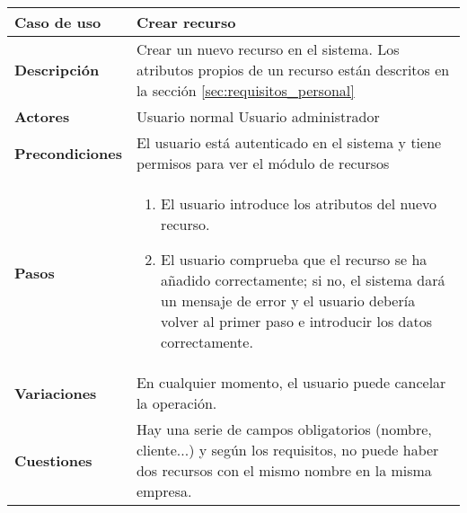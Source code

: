 \begin{tabular}{|p{1.25in}|p{3.65in}|}\hline
\textbf{Caso de uso} & \textbf{Crear recurso}\\\hline\hline
\textbf{Descripción} & Crear un nuevo recurso en el sistema. Los
atributos propios de un recurso están descritos en la sección
\ref{sec:requisitos_personal}\\\hline
\textbf{Actores} & Usuario normal \newline Usuario administrador\\\hline
\textbf{Precondiciones} & El usuario está autenticado en el sistema y
tiene permisos para ver el módulo de recursos\\\hline
\textbf{Pasos} & 
  \begin{enumerate}
   \item El usuario introduce los atributos del nuevo recurso.
   \item El usuario comprueba que el recurso se ha añadido correctamente; si
no, el sistema dará un mensaje de error y el usuario debería volver al primer
paso e introducir los datos correctamente.
  \end{enumerate}
\\\hline
\textbf{Variaciones} & En cualquier momento, el usuario puede cancelar
la operación.\\\hline
\textbf{Cuestiones} & Hay una serie de campos obligatorios (nombre,
cliente...) y según los requisitos, no puede haber dos recursos
con el mismo nombre en la misma empresa.\\\hline
\end{tabular}

